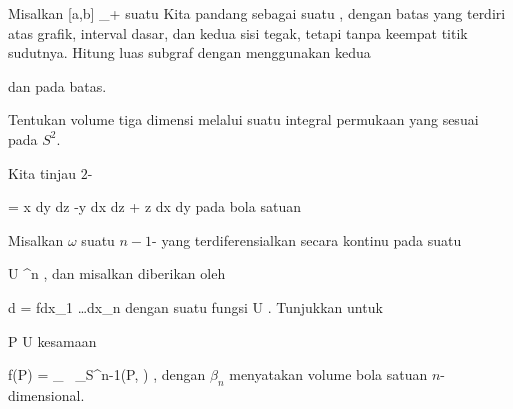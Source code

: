 {}
{

Misalkan
 { [a,b] } { \R_{+}
} {}
suatu
Kita pandang
sebagai suatu
,
dengan batas yang terdiri atas grafik, interval dasar, dan kedua sisi tegak, tetapi tanpa keempat titik sudutnya. Hitung luas subgraf dengan menggunakan kedua

 dan
pada batas.

}
{} {}

{}
{

Tentukan volume
tiga dimensi melalui suatu integral permukaan yang sesuai pada
$S^2$.

}
{} {}

{}
{

Kita tinjau
$2$-

\mavergleichskettedisp
{\vergleichskette
{ \omega
}
{ =} { x dy \wedge dz -y dx \wedge dz + z dx \wedge dy
}
{ } {
}
{ } {
}
{ } {
}
}
{}{}{}
pada bola satuan

}
{} {}

{}
{

Misalkan $\omega$ suatu
$n-1$-
yang terdiferensialkan secara kontinu pada suatu

\mavergleichskette
{\vergleichskette
{ U
}
{ \subseteq }{ \R^n
}
{  }{
}
{    }{
}
{   }{
}
}
{}{}{},
dan misalkan
diberikan oleh

\mavergleichskettedisp
{\vergleichskette
{d \omega
}
{ =} { fdx_1 \wedge \ldots \wedge dx_n
}
{ } {
}
{ } {
}
{ } {
}
}
{}{}{}
dengan suatu fungsi
 { U } {\R
} {.}
Tunjukkan untuk

\mavergleichskette
{\vergleichskette
{ P
}
{ \in }{ U
}
{  }{
}
{    }{
}
{   }{
}
}
{}{}{}
kesamaan

\mavergleichskettedisp
{\vergleichskette
{ f(P)
}
{ =} { {  } \cdot {}_{   \epsilon {}  } \, {  } \int_{S^{n-1}(P, \epsilon)} \omega
}
{ } {
}
{ } {
}
{ } {
}
}
{}{}{,}
dengan $\beta_n$ menyatakan
volume
bola satuan $n$-dimensional.

}
{} {}

